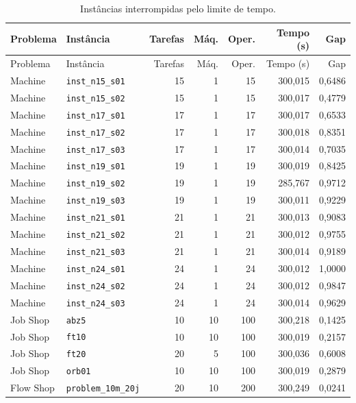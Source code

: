 \documentclass[12pt,a4paper]{article}
\begin{document}
\begin{longtable}{llrrrrr}
\caption{Instâncias interrompidas pelo limite de tempo.}
\label{tab:limite-tempo}\\
\toprule
Problema & Instância & Tarefas & Máq. & Oper. & Tempo (s) & Gap \\
\midrule
\endfirsthead
\toprule
Problema & Instância & Tarefas & Máq. & Oper. & Tempo (s) & Gap \\
\midrule
\endhead
Machine & \texttt{inst\_n15\_s01} & 15 & 1 & 15 & 300,015 & 0,6486 \\
Machine & \texttt{inst\_n15\_s02} & 15 & 1 & 15 & 300,017 & 0,4779 \\
Machine & \texttt{inst\_n17\_s01} & 17 & 1 & 17 & 300,017 & 0,6533 \\
Machine & \texttt{inst\_n17\_s02} & 17 & 1 & 17 & 300,018 & 0,8351 \\
Machine & \texttt{inst\_n17\_s03} & 17 & 1 & 17 & 300,014 & 0,7035 \\
Machine & \texttt{inst\_n19\_s01} & 19 & 1 & 19 & 300,019 & 0,8425 \\
Machine & \texttt{inst\_n19\_s02} & 19 & 1 & 19 & 285,767 & 0,9712 \\
Machine & \texttt{inst\_n19\_s03} & 19 & 1 & 19 & 300,011 & 0,9229 \\
Machine & \texttt{inst\_n21\_s01} & 21 & 1 & 21 & 300,013 & 0,9083 \\
Machine & \texttt{inst\_n21\_s02} & 21 & 1 & 21 & 300,012 & 0,9755 \\
Machine & \texttt{inst\_n21\_s03} & 21 & 1 & 21 & 300,014 & 0,9189 \\
Machine & \texttt{inst\_n24\_s01} & 24 & 1 & 24 & 300,012 & 1,0000 \\
Machine & \texttt{inst\_n24\_s02} & 24 & 1 & 24 & 300,012 & 0,9847 \\
Machine & \texttt{inst\_n24\_s03} & 24 & 1 & 24 & 300,014 & 0,9629 \\
Job Shop & \texttt{abz5} & 10 & 10 & 100 & 300,218 & 0,1425 \\
Job Shop & \texttt{ft10} & 10 & 10 & 100 & 300,019 & 0,2157 \\
Job Shop & \texttt{ft20} & 20 & 5 & 100 & 300,036 & 0,6008 \\
Job Shop & \texttt{orb01} & 10 & 10 & 100 & 300,019 & 0,2879 \\
Flow Shop & \texttt{problem\_10m\_20j} & 20 & 10 & 200 & 300,249 & 0,0241 \\
\bottomrule
\end{longtable}
\end{document}
